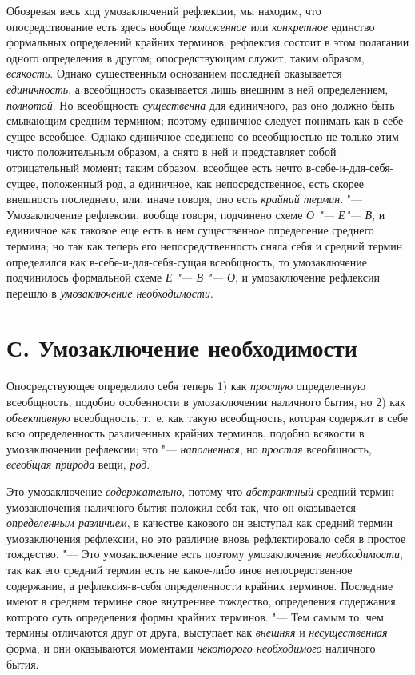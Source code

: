 Обозревая весь ход умозаключений рефлексии, мы находим, что
опосредствование есть здесь вообще
{\em положенное} или
{\em конкретное} единство
формальных определений крайних терминов: рефлексия состоит в этом полагании
одного определения в другом; опосредствующим служит, таким образом,
{\em всякость}. Однако
существенным основанием последней оказывается
{\em единичность}, а
всеобщность оказывается лишь внешним в ней определением,
{\em полнотой}. Но
всеобщность {\em существенна}
для единичного, раз оно должно быть смыкающим средним
термином; поэтому единичное следует понимать как в-себе-сущее всеобщее.
Однако единичное соединено со всеобщностью не только этим чисто
положительным образом, а снято в ней и представляет собой отрицательный
момент; таким образом, всеобщее есть нечто в-себе-и-для-себя-сущее,
положенный род, а единичное, как непосредственное, есть скорее внешность
последнего, или, иначе говоря, оно есть
{\em крайний термин}. "---
Умозаключение рефлексии, вообще говоря, подчинено схеме
{\em О "--- Е"--- В},
и единичное как таковое еще есть в нем существенное
определение среднего термина; но так как теперь его непосредственность
сняла себя и средний термин определился как
в-себе-и-для-себя-сущая всеобщность, то умозаключение
подчинилось формальной схеме {\em Е
"--- В "--- О}, и умозаключение
рефлексии перешло в {\em умозаключение
необходимости}.

\section[С. Умозаключение необходимости]{С. Умозаключение необходимости}

Опосредствующее определило себя теперь 1) как
{\em простую}
определенную всеобщность, подобно особенности в умозаключении
наличного бытия, но 2) как
{\em объективную}
всеобщность, т.~е. как такую всеобщность, которая содержит в
себе всю определенность различенных крайних терминов, подобно всякости в
умозаключении рефлексии; это
"--- {\em наполненная}, но
{\em простая}
всеобщность, {\em всеобщая
природа} вещи,
{\em род}.

Это умозаключение
{\em содержательно},
потому что
{\em абстрактный} средний
термин умозаключения наличного бытия положил себя так, что он оказывается
{\em определенным различием},
в качестве какового он выступал как средний термин
умозаключения рефлексии, но это различие вновь рефлектировало себя в
простое тождество. "--- Это умозаключение есть поэтому
умозаключение {\em необходимости},
так как его средний термин есть не какое-либо иное
непосредственное содержание, а рефлексия-в-себя определенности крайних
терминов. Последние имеют в среднем термине свое внутреннее тождество,
определения содержания которого суть определения формы крайних терминов. "---
Тем самым то, чем термины отличаются друг от друга, выступает
как {\em внешняя} и
{\em несущественная}
форма, и они оказываются моментами
{\em некоторого необходимого}
наличного бытия.

